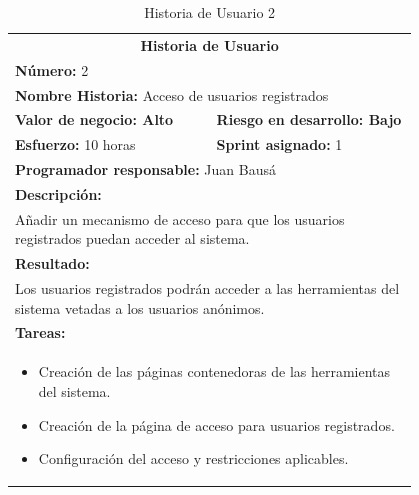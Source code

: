 	\begin{table}[H]
	  \centering 
	  \begin{tabular}{p{0.4\linewidth}p{0.4\linewidth}}
	    \toprule
	    \multicolumn{2}{c}{\cellcolor{black!30}\textbf{Historia de Usuario}} 													\\
		\multicolumn{2}{l}{\cellcolor{gray!25}\textbf{Número: }2}																\\
		\multicolumn{2}{l}{\textbf{Nombre Historia: } Acceso de usuarios registrados}													\\
		\cellcolor{gray!25}\textbf{Valor de negocio: Alto}	&	\cellcolor{gray!25}\textbf{Riesgo en desarrollo: Bajo}			\\
		\textbf{Esfuerzo:} 10 horas				&	\textbf{Sprint asignado: }1 												\\
		\multicolumn{2}{l}{\cellcolor{gray!25}\textbf{Programador responsable: }Juan Bausá}									\\
		\multicolumn{2}{l}{\textbf{Descripción:}}                                                     						\\
		\multicolumn{2}{l}{	Añadir un mecanismo de acceso para que los usuarios registrados puedan acceder al sistema.} 		\\
		\multicolumn{2}{l}{\cellcolor{gray!25}\textbf{Resultado:}}																\\
		\multicolumn{2}{l}{Los usuarios registrados podrán acceder a las herramientas del sistema vetadas a los usuarios anónimos.} 						\\
		\multicolumn{2}{l}{\textbf{Tareas:}}																					\\
		\multicolumn{2}{l}{
			\begin{minipage}{5in}
	    		\vskip 4pt
	    		\begin{itemize}
	    			\item Creación de las páginas contenedoras de las herramientas del sistema.
	    			\item Creación de la página de acceso para usuarios registrados.
					\item Configuración del acceso y restricciones aplicables.
				\end{itemize}
			  	\vskip 4pt
		 	\end{minipage}
		} \\																				
	    \hline
	  \end{tabular}
	  \caption{Historia de Usuario 2}
	\end{table}
	
